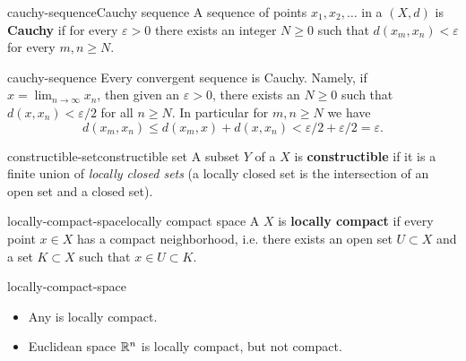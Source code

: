 \begin{topic}{cauchy-sequence}{Cauchy sequence}
    A sequence of points $x_1, x_2, \ldots$ in a  $(X, d)$ is \textbf{Cauchy} if for every $\varepsilon > 0$ there exists an integer $N \ge 0$ such that $d(x_m, x_n) < \varepsilon$ for every $m, n \ge N$.
\end{topic}

\begin{example}{cauchy-sequence}
    Every convergent sequence is Cauchy. Namely, if $x = \lim_{n \to \infty} x_n$, then given an $\varepsilon > 0$, there exists an $N \ge 0$ such that $d(x, x_n) < \varepsilon / 2$ for all $n \ge N$. In particular for $m, n \ge N$ we have
    \[ d(x_m, x_n) \le d(x_m, x) + d(x, x_n) < \varepsilon/2 + \varepsilon/2 = \varepsilon . \]
\end{example}

\begin{topic}{constructible-set}{constructible set}
    A subset $Y$ of a  $X$ is \textbf{constructible} if it is a finite union of \textit{locally closed sets} (a locally closed set is the intersection of an open set and a closed set).
\end{topic}

\begin{topic}{locally-compact-space}{locally compact space}
    A  $X$ is \textbf{locally compact} if every point $x \in X$ has a compact neighborhood, i.e. there exists an open set $U \subset X$ and a  set $K \subset X$ such that $x \in U \subset K$.
\end{topic}

\begin{example}{locally-compact-space}
    \begin{itemize}
        \item Any  is locally compact.
        \item Euclidean space $\mathbb{R}^n$ is locally compact, but not compact.
    \end{itemize}
\end{example}